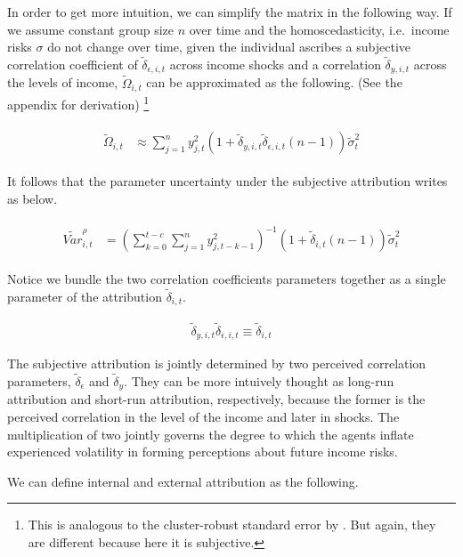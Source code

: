 \documentclass[12pt,notitlepage,onecolumn,aps,pra]{article}
\begin{document}
In order to get more intuition, we can simplify the matrix in the
following way. If we assume constant group size \(n\) over time and the
homoscedasticity, i.e.~income risks \(\sigma\) do not change over time,
given the individual ascribes a subjective correlation coefficient of
\(\tilde \delta_{\epsilon, i,t}\) across income shocks and a correlation
\(\tilde \delta_{y, i,t}\) across the levels of income,
\(\tilde \Omega_{i,t}\) can be approximated as the following. (See the
appendix for derivation)
\footnote{This is analogous to the cluster-robust standard error by \cite{cameron2011robust}. But again, they are different because here it is subjective.}

\begin{eqnarray}
\begin{split}
\tilde \Omega_{i,t} & \approx \sum^{n}_{j=1}y^2_{j,t} (1+\tilde \delta_{y,i,t}\tilde \delta_{\epsilon,i,t}(n-1))\tilde \sigma^2_{t}
\end{split}
\end{eqnarray}

It follows that the parameter uncertainty under the subjective
attribution writes as below.

\begin{eqnarray}
\begin{split}
\tilde {Var}^{\rho}_{i,t} & = (\sum^{t-c}_{k=0}\sum^{n}_{j=1}y^2_{j,t-k-1})^{-1}(1+ \tilde\delta_{i,t}(n-1))\tilde{\sigma}^2_{t}
\end{split}
\end{eqnarray}

Notice we bundle the two correlation coefficients parameters together as
a single parameter of the attribution \(\tilde\delta_{i,t}\).

\begin{eqnarray}
\tilde \delta_{y,i,t}\tilde \delta_{\epsilon,i,t}\equiv \tilde \delta_{i,t}  
\end{eqnarray}

The subjective attribution is jointly determined by two perceived
correlation parameters, \(\tilde \delta_{\epsilon}\) and
\(\tilde \delta_y\). They can be more intuively thought as long-run
attribution and short-run attribution, respectively, because the former
is the perceived correlation in the level of the income and later in
shocks. The multiplication of two jointly governs the degree to which
the agents inflate experienced volatility in forming perceptions about
future income risks.

We can define internal and external attribution as the following.
\end{document}
